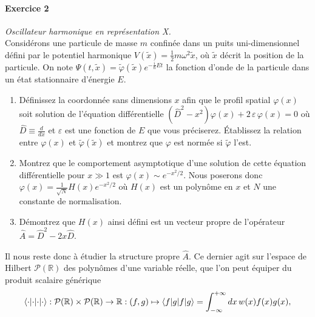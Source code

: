 \paragraph{Exercice 2} \textit{Oscillateur harmonique en représentation X.} \\
Considérons une particule de masse $m$ confinée dans un puits uni-dimensionnel défini par le potentiel harmonique $V(\tilde x) = \frac{1}{2}m\omega^2\tilde x$, où $\tilde x$ décrit la position de la particule. On note $\Psi(t,\tilde x) = \tilde \varphi(\tilde x)e^{-\frac{i}{\hbar}E t}$ la fonction d'onde de la particule dans un état stationnaire d'énergie $E$. 
\begin{enumerate}
\item Définissez la coordonnée sans dimensions $x$ afin que le profil spatial $\varphi(x)$ soit solution de l'équation différentielle $(\hat D^2-x^2)\varphi(x) + 2\,\varepsilon\,\varphi(x)=0$ où $\hat D \equiv \frac{d}{dx}$ et $\varepsilon$ est une fonction de $E$ que vous préciserez. Établissez la relation entre $\varphi(x)$ et $\tilde \varphi(\tilde x)$ et montrez que $\varphi$ est normée si $\tilde\varphi$ l'est.
\item Montrez que le comportement asymptotique d'une solution de cette équation différentielle pour $x\gg 1$ est $\varphi(x)\sim e^{-x^2/2}$. Nous poserons donc $\varphi(x) = \frac{1}{\sqrt{N}}H(x)e^{-x^2/2}$ où $H(x)$ est un polynôme en $x$ et $N$ une constante de normalisation.
\item Démontrez que $H(x)$ ainsi défini est un vecteur propre de l'opérateur $\hat A = \hat D^2-2x\hat D$.
\end{enumerate}
Il nous reste donc à étudier la structure propre $\hat A$. Ce dernier agit sur l'espace de Hilbert $\mathcal P(\mathbb R)$ des polynômes d'une variable réelle, que l'on peut équiper du produit scalaire générique
\begin{equation}
\braket{\cdot|\cdot} : \mathcal P(\mathbb R) \times \mathcal P(\mathbb R) \to \mathbb R : (f,g) \mapsto \braket{f|g} = \int_{-\infty}^{+\infty} dx \, w(x)f(x)g(x), \label{eq:PS}
\end{equation}
